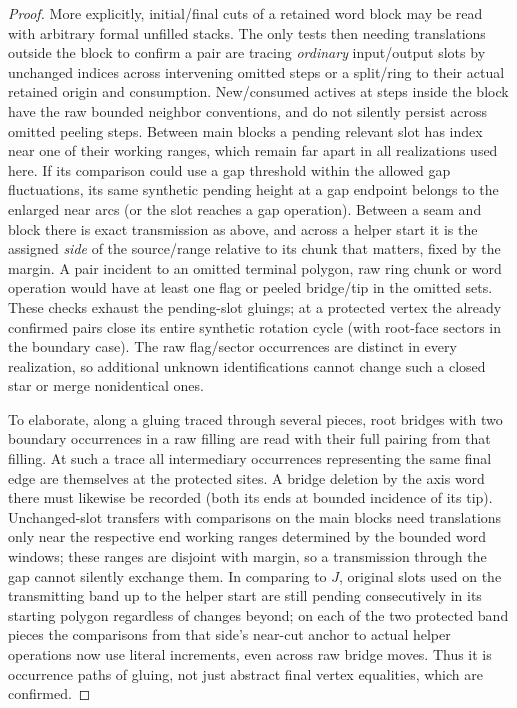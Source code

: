 \begin{proof}
More explicitly, initial/final cuts of a retained word block may be read with arbitrary
formal unfilled stacks. The only tests then needing translations outside the block to
confirm a pair are tracing \emph{ordinary} input/output slots by unchanged indices across
intervening omitted steps or a split/ring to their actual retained origin and consumption.
New/consumed actives at steps inside the block have the raw bounded neighbor conventions,
and do not silently persist across omitted peeling steps. Between main blocks a pending
relevant slot has index near one of their working ranges, which remain far apart in all
realizations used here. If its comparison could use a gap threshold within the allowed gap
fluctuations, its same synthetic pending height at a gap endpoint belongs to the enlarged
near arcs (or the slot reaches a gap operation). Between a seam and block there is exact
transmission as above, and across a helper start it is the assigned \emph{side} of the
source/range relative to its chunk that matters, fixed by the margin. A pair incident to
an omitted terminal polygon, raw ring chunk or word operation would have at least one flag
or peeled bridge/tip in the omitted sets. These checks exhaust the pending-slot gluings;
at a protected vertex the already confirmed pairs close its entire synthetic rotation
cycle (with root-face sectors in the boundary case). The raw flag/sector occurrences are
distinct in every realization, so additional unknown identifications cannot change such a
closed star or merge nonidentical ones.

To elaborate, along a gluing traced through
several pieces, root bridges with two boundary occurrences in a raw filling are read with
their full pairing from that filling. At such a trace all intermediary occurrences
representing the same final edge are themselves at the protected sites. A bridge deletion
by the axis word there must likewise be recorded (both its ends at bounded incidence of
its tip). Unchanged-slot transfers with comparisons on the main blocks need translations
only near the respective end working ranges determined by the bounded word windows; these
ranges are disjoint with margin, so a transmission through the gap cannot silently
exchange them. In comparing to \(J\), original slots used on the transmitting band up to
the helper start are still pending consecutively in its starting polygon regardless of
changes beyond; on each of the two protected band pieces the comparisons from that side's
near-cut anchor to actual helper operations now use literal increments, even across raw
bridge moves. Thus it is occurrence paths of gluing, not just abstract final vertex
equalities, which are confirmed.


\end{proof}
